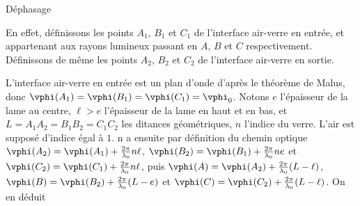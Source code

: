 \begin{exo}[PC][1][appli]{Déphasage}
{  
  En effet, définissons les points $A_1$, $B_1$ et $C_1$ de l'interface air-verre en entrée, et appartenant aux rayons lumineux passant en $A$, $B$ et $C$ respectivement. Définissons de même les points $A_2$, $B_2$ et $C_2$ de l'interface air-verre en sortie.
  
  L'interface air-verre en entrée est un plan d'onde d'après le théorème de Malus, donc $\vphi(A_1) = \vphi(B_1) = \vphi(C_1)=\vphi_0$. Notons $e$ l'épaisseur de la lame au centre, $\ell>e$ l'épaisseur de la lame en haut et en bas, et $L=A_1A_2=B_1B_2=C_1C_2$ les ditances géométriques, $n$ l'indice du verre. L'air est supposé d'indice égal à $1$.
  n a ensuite par définition du chemin optique $\vphi(A_2) = \vphi(A_1) +\frac{2\pi}{\lambda_0}n\ell$, $\vphi(B_2) = \vphi(B_1) + \frac{2\pi}{\lambda_0}ne$ et $\vphi(C_2) = \vphi(C_1) + \frac{2\pi}{\lambda_0}n\ell$, puis $\vphi(A) = \vphi(A_2) + \frac{2\pi}{\lambda_0}(L-\ell)$, $\vphi(B) = \vphi(B_2) + \frac{2\pi}{\lambda_0}(L-e)$ et $\vphi(C) = \vphi(C_2) + \frac{2\pi}{\lambda_0}(L-\ell)$. On en déduit 
}
\end{exo}

